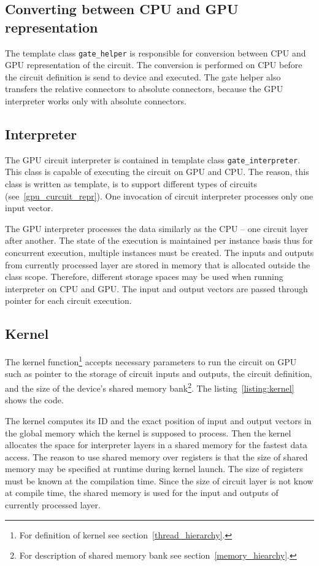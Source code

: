 \documentclass[12pt,oneside]{fithesis2}
\begin{document}
\subsection{Converting between CPU and GPU representation}

The template class \texttt{gate\_helper} is responsible for conversion between CPU and GPU representation of the circuit. The conversion is performed on CPU before the circuit definition is send to device and executed. The gate helper also transfers the relative connectors to absolute connectors, because the GPU interpreter works only with absolute connectors.

\subsection{Interpreter}

The GPU circuit interpreter is contained in template class \texttt{gate\_interpreter}. This class is capable of executing the circuit on GPU and CPU. The reason, this class is written as template, is to support different types of circuits (see~\ref{gpu_curcuit_repr}). One invocation of circuit interpreter processes only one input vector.

The GPU interpreter processes the data similarly as the CPU -- one circuit layer after another. The state of the execution is maintained per instance basis thus for concurrent execution, multiple instances must be created. The inputs and outputs from currently processed layer are stored in memory that is allocated outside the class scope. Therefore, different storage spaces may be used when running interpreter on CPU and GPU. The input and output vectors are passed through pointer for each circuit execution.

\subsection{Kernel}

The kernel function\footnote{For definition of kernel see section~\ref{thread_hierarchy}.} accepts necessary parameters to run the circuit on GPU such as pointer to the storage of circuit inputs and outputs, the circuit definition, and the size of the device's shared memory bank\footnote{For description of shared memory bank see section~\ref{memory_hiearchy}.}. The listing~\ref{listing:kernel} shows the code.

The kernel computes its ID and the exact position of input and output vectors in the global memory which the kernel is supposed to process. Then the kernel allocates the space for interpreter layers in a shared memory for the fastest data access. The reason to use shared memory over registers is that the size of shared memory may be specified at runtime during kernel launch. The size of registers must be known at the compilation time. Since the size of circuit layer is not know at compile time, the shared memory is used for the input and outputs of currently processed layer.
\end{document}

